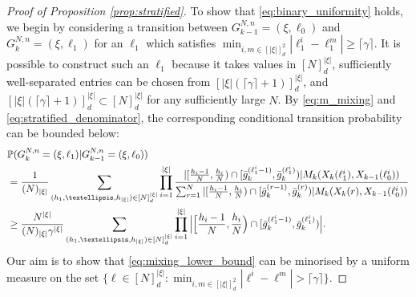 \documentclass[10pt,a4paper]{amsart}
\newcommand{\bbP}{\mathbb{P}}
\begin{document}
\begin{proof}[Proof of Proposition \ref{prop:stratified}]
To show that \eqref{eq:binary_uniformity} holds, we begin by considering a transition between $G_{ k - 1 }^{ N, n } = ( \xi, \ell_0 )$ and $G_k^{ N, n } = ( \xi, \ell_1 )$ for an $\ell_1$ which satisfies $\min_{i, m \in [|\xi|]_d^2} | \ell_1^i - \ell_1^m| \geq \lceil \gamma \rceil$.
It is possible to construct such an $\ell_1$ because it takes values in $[N]_d^{|\xi|}$, sufficiently well-separated entries can be chosen from $[| \xi | ( \lceil \gamma \rceil + 1 )]_d^{|\xi|}$, and $[| \xi | ( \lceil \gamma \rceil + 1 )]_d^{|\xi|} \subset [N]_d^{|\xi|}$ for any sufficiently large $N$.
By \eqref{eq:m_mixing} and \eqref{eq:stratified_denominator}, the corresponding conditional transition probability can be bounded below:
\begin{align}
&\bbP( G_k^{ N, n } = ( \xi, \ell_1 ) | G_{ k - 1 }^{ N, n } = ( \xi, \ell_0 )  ) \notag \\
&= \frac{ 1 }{ ( N )_{ | \xi | } } \sum_{ ( h_1, \ldots, h_{ | \xi | } ) \in [ N ]_d^{ | \xi | } } \prod_{ i = 1 }^{ | \xi | } \frac{ | [ \frac{ h_i - 1 }{ N }, \frac{ h_i }{ N } ) \cap [ \bar{ g }_k^{ ( \ell_1^i - 1 ) }, \bar{ g }_k^{ ( \ell_1^i ) } ) | M_k( X_k( \ell_1^i ), X_{ k - 1 }( \ell_0^i ) ) }{ \sum_{ r = 1 }^N| [ \frac{ h_i - 1 }{ N }, \frac{ h_i }{ N } ) \cap [ \bar{ g }_k^{ ( r - 1 ) }, \bar{ g }_k^{ ( r ) } ) | M_k( X_k( r ), X_{ k - 1 }( \ell_0^i ) ) } \notag \\
&\geq \frac{ N^{ | \xi | } }{ ( N )_{ | \xi | } \gamma^{ | \xi | } } \sum_{ ( h_1, \ldots, h_{ | \xi | } ) \in [ N ]_d^{ | \xi | } } \prod_{ i = 1 }^{ | \xi | } \Big| \Big[ \frac{ h_i - 1 }{ N }, \frac{ h_i }{ N } \Big) \cap [ \bar{ g }_k^{ ( \ell_1^i - 1 ) }, \bar{ g }_k^{ ( \ell_1^i ) } ) \Big|. \label{eq:mixing_lower_bound}
\end{align}
Our aim is to show that \eqref{eq:mixing_lower_bound} can be minorised by a uniform measure on the set $\{ \ell \in [ N ]_d^{ | \xi | } : \min_{i, m \in [ | \xi | ]_d^2} | \ell^i - \ell^m | > \lceil \gamma \rceil \}$.


\end{proof}
\end{document}
